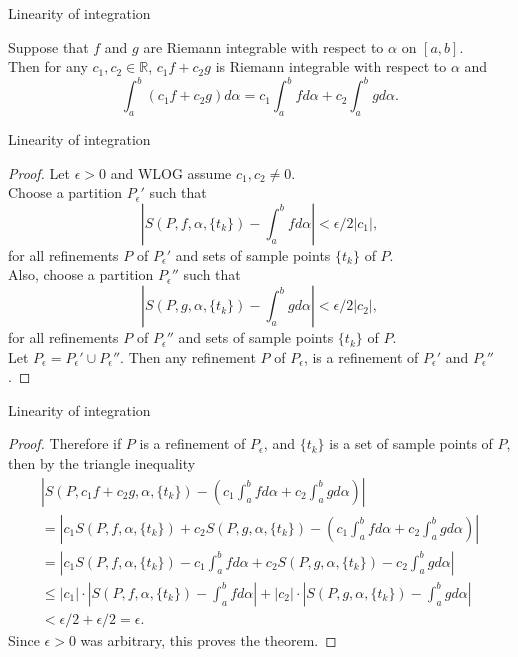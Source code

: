 \documentclass{beamer}
\begin{document}
\begin{frame}{Linearity of integration}
\begin{thm}
Suppose that $f$ and $g$ are Riemann integrable with respect to $\alpha$ on $[a,b]$.\\
\pause
Then for any $c_1,c_2\in\mathbb{R}$, $c_1f + c_2g$ is Riemann integrable with respect to $\alpha$ and
$$\int_a^b (c_1f + c_2g) d\alpha = c_1\int_a^b f d\alpha + c_2\int_a^b g d\alpha.$$
\end{thm}

\end{frame}
\begin{frame}{Linearity of integration}
\begin{proof}
\pause
Let $\epsilon > 0$ and WLOG assume $c_1,c_2\neq 0$.\\
\pause
Choose a partition $P_\epsilon'$ such that
$$|S(P,f,\alpha,\{t_k\}) - \int_a^bf d\alpha| < \epsilon/2|c_1|,$$
for all refinements $P$ of $P_\epsilon'$ and sets of sample points $\{t_k\}$ of $P$.\\
\pause
Also, choose a partition $P_\epsilon''$ such that
$$|S(P,g,\alpha,\{t_k\}) - \int_a^bg d\alpha| < \epsilon/2|c_2|,$$
for all refinements $P$ of $P_\epsilon''$ and sets of sample points $\{t_k\}$ of $P$.\\
\pause
Let $P_\epsilon = P_\epsilon'\cup P_\epsilon''$. 
\pause
Then any refinement $P$ of $P_\epsilon$, is a refinement of $P_\epsilon'$ and $P_\epsilon''$.
\end{proof}
\end{frame}
\begin{frame}{Linearity of integration}
\begin{proof}
Therefore if $P$ is a refinement of $P_\epsilon$, and $\{t_k\}$ is a set of sample points of $P$, then by the triangle inequality
\pause
\begin{align*}
|S(P,c_1f+c_2g,\alpha,\{t_k\}) - (c_1\int_a^b fd\alpha+c_2\int_a^bgd\alpha)|\\
 = |c_1S(P,f,\alpha,\{t_k\}) + c_2S(P,g,\alpha,\{t_k\})- (c_1\int_a^b fd\alpha+c_2\int_a^bgd\alpha)|\\
 = |c_1S(P,f,\alpha,\{t_k\}) - c_1\int_a^b fd\alpha + c_2S(P,g,\alpha,\{t_k\})- c_2\int_a^bgd\alpha|\\
 \leq |c_1|\cdot |S(P,f,\alpha,\{t_k\}) - \int_a^b fd\alpha| + |c_2|\cdot |S(P,g,\alpha,\{t_k\})- \int_a^bgd\alpha|\\
 < \epsilon/2 + \epsilon/2 = \epsilon.
\end{align*}
\pause
Since $\epsilon>0$ was arbitrary, this proves the theorem.
\end{proof}
\end{frame}
\end{document}
